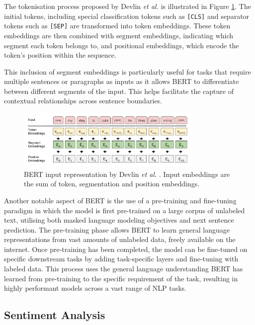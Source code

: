 The tokenisation process proposed by Devlin \textit{et al.} \cite{BERT} is illustrated in Figure \ref{fig:bert}. The initial tokens, including special classification tokens such as \verb|[CLS]| and separator tokens such as \verb|[SEP]| are transformed into token embeddings. These token embeddings are then combined with segment embeddings, indicating which segment each token belongs to, and positional embeddings, which encode the token's position within the sequence.

This inclusion of segment embeddings is particularly useful for tasks that require multiple sentences or paragraphs as inputs as it allows BERT to differentiate between different segments of the input. This helps facilitate the capture of contextual relationships across sentence boundaries.

\begin{figure}[H]
    \centering
    \includegraphics[width=0.8\textwidth]{graphs/bert.png}
    \caption{BERT input representation by Devlin \textit{et al.} \cite{BERT}. Input embeddings are the sum of token, segmentation and position embeddings.}
    \label{fig:bert}
\end{figure}

Another notable aspect of BERT is the use of a pre-training and fine-tuning paradigm in which the model is first pre-trained on a large corpus of unlabeled text, utilising both masked language modeling objectives and next sentence prediction. The pre-training phase allows BERT to learn general language representations from vast amounts of unlabeled data, freely available on the internet. Once pre-training has been completed, the model can be fine-tuned on specific downstream tasks by adding task-specific layers and fine-tuning with labeled data. This process uses the general language understanding BERT has learned from pre-training to the specific requirement of the task, resulting in highly performant models across a vast range of NLP tasks.

\subsection{Sentiment Analysis}

